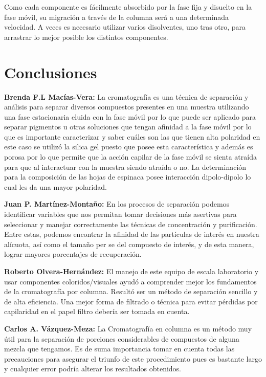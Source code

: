 \documentclass{ITESO-Reporte}
\begin{document}
Como cada componente es fácilmente absorbido por la fase fija y disuelto en la fase móvil, su migración a través de la columna será a una determinada velocidad. A veces es necesario utilizar varios disolventes, uno tras otro, para arrastrar lo mejor posible los distintos componentes.


\section{Conclusiones}

{\color{darkgray}\bfseries Brenda F.L Macías-Vera:}\hspace{1em}
La cromatografía es una técnica de separación y análisis para separar diversos compuestos presentes en una muestra utilizando una fase estacionaria eluida con la fase móvil por lo que puede ser aplicado para separar pigmentos u otras soluciones que tengan afinidad a la fase móvil por lo que es importante caracterizar y saber cuáles son las que tienen alta polaridad en este caso se utilizó la silica gel puesto que posee esta característica y además es porosa por lo que permite que la acción capilar de la fase móvil se sienta atraída para que al interactuar con la muestra siendo atraída o no. La determinación para la composición de las hojas de espinaca posee interacción dipolo-dipolo lo cual les da una mayor polaridad.

{\color{darkgray}\bfseries Juan P. Martínez-Montaño:}\hspace{1em}
En los procesos de separación podemos identificar variables que nos permitan tomar decisiones más asertivas para seleccionar y manejar correctamente las técnicas de concentración y purificación. Entre estas, podemos encontrar la afinidad de las partículas de interés en nuestra alícuota, así como el tamaño per se del compuesto de interés, y de esta manera, lograr mayores porcentajes de recuperación. 

{\color{darkgray}\bfseries Roberto Olvera-Hernández:}\hspace{1em}
El manejo de este equipo de escala laboratorio y usar componentes coloridos/visuales ayudó a comprender mejor los fundamentos de la cromatografía por columna. Resultó ser un método de separación sencillo y de alta eficiencia. Una mejor forma de filtrado o técnica para evitar pérdidas por capilaridad en el papel filtro debería ser tomada en cuenta.

{\color{darkgray}\bfseries Carlos A. Vázquez-Meza:}\hspace{1em}
La Cromatografía en columna es un método muy útil para la separación de porciones considerables de compuestos de alguna mezcla que tengamos. Es de suma importancia tomar en cuenta todas las precauciones para asegurar el triunfo de este procedimiento pues es bastante largo y cualquier error podría alterar los resultados obtenidos.
\end{document}
